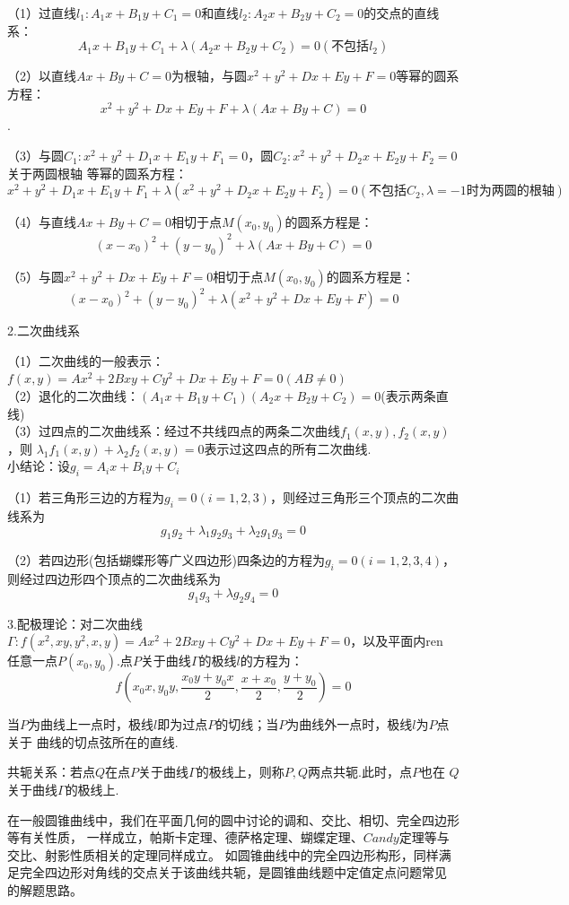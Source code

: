 （1）过直线$l_1:A_1x+B_1y+C_1=0$和直线$l_2:A_2x+B_2y+C_2=0$的交点的直线系：
$$A_1x+B_1y+C_1+\lambda (A_2x+B_2y+C_2)=0(\text{不包括}l_2)$$

（2）以直线$Ax+By+C=0$为根轴，与圆$x^2+y^2+Dx+Ey+F=0$等幂的圆系方程：
$$x^2+y^2+Dx+Ey+F+\lambda(Ax+By+C)=0$$.

（3）与圆$C_1:x^2+y^2+D_1x+E_1y+F_1=0$，圆$C_2:x^2+y^2+D_2x+E_2y+F_2=0$关于两圆根轴
等幂的圆系方程：
$$x^2+y^2+D_1x+E_1y+F_1+\lambda(x^2+y^2+D_2x+E_2y+F_2)=0(\text{不包括}C_2,\lambda=-1 \text{时为两圆的根轴})$$

（4）与直线$Ax+By+C=0$相切于点$M(x_0,y_0)$的圆系方程是：
$$ (x-x_0)^2+(y-y_0)^2+\lambda(Ax+By+C)=0 $$

（5）与圆$x^2+y^2+Dx+Ey+F=0$相切于点$M(x_0,y_0)$的圆系方程是：
$$ (x-x_0)^2+(y-y_0)^2+\lambda(x^2+y^2+Dx+Ey+F)=0 $$

2.二次曲线系

（1）二次曲线的一般表示：$f(x,y)=Ax^2+2Bxy+Cy^2+Dx+Ey+F=0(AB\neq 0)$
~\\

（2）退化的二次曲线：$(A_1x+B_1y+C_1)(A_2x+B_2y+C_2)=0$(表示两条直线)
~\\

（3）过四点的二次曲线系：经过不共线四点的两条二次曲线$f_1(x,y),f_2(x,y)$，则
$\lambda_1 f_1(x,y)+\lambda_2 f_2(x,y)=0$表示过这四点的所有二次曲线.
~\\

小结论：设$g_i=A_ix+B_iy+C_i$

（1）若三角形三边的方程为$g_i=0(i=1,2,3)$，则经过三角形三个顶点的二次曲线系为
$$g_1g_2+\lambda_1g_2g_3+\lambda_2g_1g_3=0$$

（2）若四边形(包括蝴蝶形等广义四边形)四条边的方程为$g_i=0(i=1,2,3,4)$，则经过四边形四个顶点的二次曲线系为
$$ g_1g_3+\lambda g_2g_4=0 $$

3.配极理论：对二次曲线$\varGamma:f(x^2,xy,y^2,x,y)=Ax^2+2Bxy+Cy^2+Dx+Ey+F=0 $，以及平面内ren
任意一点$P(x_0,y_0)$.点$P$关于曲线$\varGamma$的极线$l$的方程为：
$$ f(x_0x,y_0y,\dfrac{x_0y+y_0x}{2},\dfrac{x+x_0}{2},\dfrac{y+y_0}{2}) =0$$

当$P$为曲线上一点时，极线$l$即为过点$P$的切线；当$P$为曲线外一点时，极线$l$为$P$点关于
曲线的切点弦所在的直线.

共轭关系：若点$Q$在点$P$关于曲线$\varGamma$的极线上，则称$P,Q$两点共轭.此时，点$P$也在
$Q$关于曲线$\varGamma$的极线上.

在一般圆锥曲线中，我们在平面几何的圆中讨论的调和、交比、相切、完全四边形等有关性质，
一样成立，帕斯卡定理、德萨格定理、蝴蝶定理、$Candy$定理等与交比、射影性质相关的定理同样成立。
如圆锥曲线中的完全四边形构形，同样满足完全四边形对角线的交点关于该曲线共轭，是圆锥曲线题中定值定点问题常见
的解题思路。

